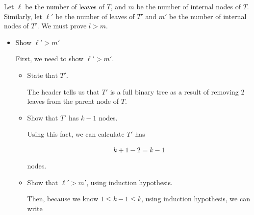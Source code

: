 \documentclass[12pt]{article}
\begin{document}
\begin{itemize}
\begin{mdframed}
\begin{enumerate}[1.]
            \bigskip

            Let $\ell$ be the number of leaves of $T$, and $m$ be the number of
            internal nodes of $T$. Similarly, let $\ell'$ be the number of leaves of
            $T'$ and $m'$ be the number of internal nodes of $T'$. We must prove
            $l > m$.

            \bigskip

            \begin{itemize}

                \item Show $\ell' > m'$

                \bigskip

                First, we need to show $\ell' > m'$.

                \bigskip

                \begin{itemize}
                    \item State that $T'$.

                    \begin{mdframed}

                    The header tells us that $T'$ is a full binary tree as a result
                    of removing 2 leaves from the parent node of $T$.

                    \end{mdframed}
                    \item Show that $T'$ has $k-1$ nodes.

                    \begin{mdframed}
                    Using this fact, we can calculate $T'$ has

                    \begin{align}
                        k+1-2 = k-1
                    \end{align}

                    nodes.

                    \end{mdframed}

                    \item Show that $\ell' > m'$, using induction hypothesis.

                    \begin{mdframed}
                    Then, because we know $1 \leq k-1 \leq k$, using induction hypothesis,
                    we can write


\end{mdframed}
\end{itemize}
\end{itemize}
\end{enumerate}
\end{mdframed}
\end{itemize}
\end{document}
